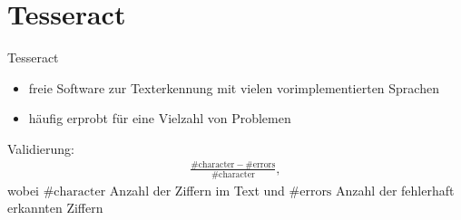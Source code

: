 \section{Tesseract}

\begin{frame}{Tesseract}
    \begin{itemize}
    	\item freie Software zur Texterkennung mit vielen vorimplementierten Sprachen
    	\item häufig erprobt für eine Vielzahl von Problemen 
    \end{itemize}
    \vspace{0.2cm}
    Validierung:
    \begin{align*}
    \frac{\# \text{character} - \# \text{errors}}{\# \text{character}},
    \end{align*}
    wobei $\# \text{character}$ Anzahl der Ziffern im Text und $\# \text{errors}$ Anzahl der fehlerhaft erkannten Ziffern
\end{frame}